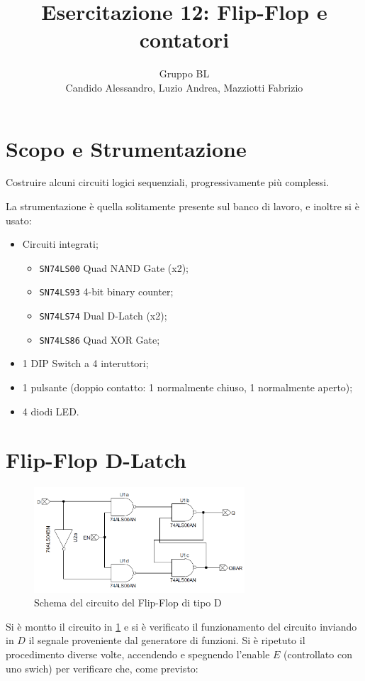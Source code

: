 \documentclass[a4paper,10pt]{article}
\title{Esercitazione 12: Flip-Flop e contatori}
\author{Gruppo BL \\ Candido Alessandro, Luzio Andrea, Mazziotti Fabrizio}
\def\code#1{\texttt{#1}}
\begin{document}
\maketitle

\section{Scopo e Strumentazione}
Costruire alcuni circuiti logici sequenziali, progressivamente
più complessi.

La strumentazione è quella solitamente presente sul banco di lavoro, e inoltre si è usato:
\begin{itemize}
	\item Circuiti integrati;
	\begin{itemize}
		\item \code{SN74LS00} Quad NAND Gate (x2);
		\item \code{SN74LS93} 4-bit binary counter;
		\item \code{SN74LS74} Dual D-Latch (x2);
		\item \code{SN74LS86} Quad XOR Gate;
	\end{itemize}
	\item 1 DIP Switch a 4 interuttori;
	\item 1 pulsante (doppio contatto: 1 normalmente chiuso, 1 normalmente aperto);
	\item 4 diodi LED.
\end{itemize}




\section{Flip-Flop D-Latch}

\begin{figure}[H]
	\centering
	\includegraphics[width=0.7\textwidth]{../grafici/FlipFlopD.png}
	\caption{Schema del circuito del Flip-Flop di tipo D}
	\label{fig:FFD}
\end{figure}
Si è montto il circuito in \cref{fig:FFD} e si è verificato il funzionamento del circuito inviando in $D$ il segnale proveniente dal generatore di funzioni. Si è ripetuto il procedimento diverse volte, accendendo e spegnendo l'enable $E$ (controllato con uno swich) per verificare che, come previsto:\\
\end{document}

